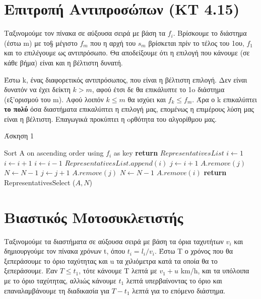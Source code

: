 \documentclass[a4paper,11pt]{article}
\begin{document}
\renewcommand{\labelenumi}{\roman{enumi})}
\renewcommand{\labelenumii}{(\arabic{enumii})}



\section{Επιτροπή Αντιπροσώπων (KT 4.15)} \setcounter{section}{1}
Ταξινομούμε τον πίνακα σε αύξουσα σειρά με βάση τα $f_i$. Βρίσκουμε το διάστημα (έστω m) με το§
μέγιστο $f_m$ που η αρχή του $s_m$ βρίσκεται πρίν το τέλος του 1ου, $f_1$ και
το επιλέγουμε ως αντιπρόσωπο.
Θα αποδείξουμε ότι η επιλογή που κάνουμε (σε κάθε βήμα) είναι και η βέλτιστη
δυνατή.

Έστω k, ένας διαφορετικός αντιπρόσωπος, που είναι η βέλτιστη επιλογή. Δεν
είναι δυνατόν να έχει δείκτη $k > m$, αφού έτσι δε θα επικάλυπτε το 1o διάστημα
(εξ'ορισμού του m). Αφού λοιπόν $k \leq m$ θα ισχύει και $f_k \leq f_m$. Άρα ο
k επικαλύπτει \textbf{το πολύ} όσα διαστήματα επικαλύπτει η επιλογή μας,
επομένως η επιμέρους λύση μας είναι η βέλτιστη.
Eπαγωγικά προκύπτει η oρθότητα του αλγορίθμου μας.

\begin{algorithm}[H]
\caption{Άσκηση 1}
\begin{algorithmic}[1]
    \State Sort A on ascending order using $f_i$ as key
    \State \textbf{return} $RepresentativesList$
    \Else
    \State $i \gets 1$
        \State $i \gets i+1$
    \EndWhile
    \State $i \gets i-1$
    \State $RepresentativesList.append (i)$
    \State $j \gets i+1$
	\State $A.remove(j)$
	\State $N \gets N-1$
	\State $j \gets j+1$
    \EndWhile
	\State $A.remove (j)$
	\State $N \gets N-1$
    \EndFor
    \State $A.remove(i)$
    \State \textbf{return} RepresentativesSelect ($A, N$)
    \EndIf
\EndProcedure
\end{algorithmic}
\end{algorithm}



\section{Βιαστικός Μοτοσυκλετιστής}
Ταξινομούμε τα διαστήματα σε αύξουσα σειρά με βάση τα όρια ταχυτήτων $v_i$ και
δημιουργούμε τον πίνακα χρόνων t, όπου $t_i = l_i/v_i$.
Έστω Τ ο χρόνος που θα ξεπεράσουμε το όριο ταχύτητας και u τα χιλιόμετρα κατά
τα οποία θα το ξεπεράσουμε. Έαν $T \leq t_1$, τότε κάνουμε Τ λεπτά με $v_1 +
u$ km/h, και τα υπόλοιπα με το όριο ταχύτητας, αλλιώς κάνουμε $t_1$ λεπτά
υπερβαίνοντας το όριο και επαναλαμβάνουμε τη διαδικασία για $T - t_1$ λεπτά
για το επόμενο διάστημα.
\end{document}
